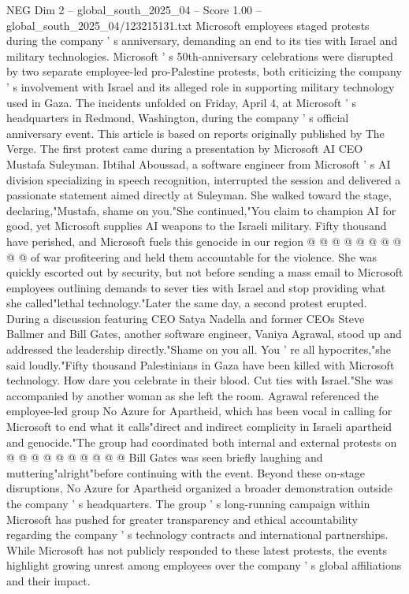 \begin{textsample}{NEG Dim 2 – global\_south\_2025\_04 – Score 1.00 – global\_south\_2025\_04/123215131.txt}  \label{ex:f2_neg_097}
Microsoft employees staged protests during the company ' s anniversary, demanding an end to its ties with Israel and military technologies.
Microsoft ' s 50th-anniversary celebrations were disrupted by two separate employee-led pro-Palestine protests, both criticizing the company ' s involvement with Israel and its alleged role in supporting military technology used in Gaza.
The incidents unfolded on Friday, April 4, at Microsoft ' s headquarters in Redmond, Washington, during the company ' s official anniversary event.
This article is based on reports originally published by The Verge.
The first protest came during a presentation by Microsoft AI CEO Mustafa Suleyman.
Ibtihal Aboussad, a software engineer from Microsoft ' s AI division specializing in speech recognition, interrupted the session and delivered a passionate statement aimed directly at Suleyman.
She walked toward the stage, declaring,"Mustafa, shame on you."She continued,"You claim to champion AI for good, yet Microsoft supplies AI weapons to the Israeli military.
Fifty thousand have perished, and Microsoft fuels this genocide in our region @ @ @ @ @ @ @ @ @ @ of war profiteering and held them accountable for the violence.
She was quickly escorted out by security, but not before sending a mass email to Microsoft employees outlining demands to sever ties with Israel and stop providing what she called"lethal technology."Later the same day, a second protest erupted.
During a discussion featuring CEO Satya Nadella and former CEOs Steve Ballmer and Bill Gates, another software engineer, Vaniya Agrawal, stood up and addressed the leadership directly."Shame on you all.
You ' re all hypocrites,"she said loudly."Fifty thousand Palestinians in Gaza have been killed with Microsoft technology.
How dare you celebrate in their blood.
Cut ties with Israel."She was accompanied by another woman as she left the room.
Agrawal referenced the employee-led group No Azure for Apartheid, which has been vocal in calling for Microsoft to end what it calls"direct and indirect complicity in Israeli apartheid and genocide."The group had coordinated both internal and external protests on @ @ @ @ @ @ @ @ @ @ Bill Gates was seen briefly laughing and muttering"alright"before continuing with the event.
Beyond these on-stage disruptions, No Azure for Apartheid organized a broader demonstration outside the company ' s headquarters.
The group ' s long-running campaign within Microsoft has pushed for greater transparency and ethical accountability regarding the company ' s technology contracts and international partnerships.
While Microsoft has not publicly responded to these latest protests, the events highlight growing unrest among employees over the company ' s global affiliations and their impact.

\end{textsample}
